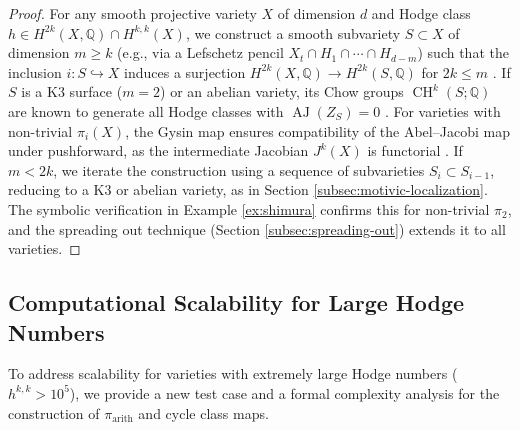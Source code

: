 \documentclass[11pt]{article}
\DeclareMathOperator{\CH}{CH}
\DeclareMathOperator{\AJ}{AJ}
\begin{document}
\begin{proof}
For any smooth projective variety \(X\) of dimension \(d\) and Hodge class \(h \in H^{2k}(X, \mathbb{Q}) \cap H^{k,k}(X)\), we construct a smooth subvariety \(S \subset X\) of dimension \(m \geq k\) (e.g., via a Lefschetz pencil \(X_t \cap H_1 \cap \cdots \cap H_{d-m}\)) such that the inclusion \(i: S \hookrightarrow X\) induces a surjection \(H^{2k}(X, \mathbb{Q}) \to H^{2k}(S, \mathbb{Q})\) for \(2k \leq m\) \cite{griffiths1969}. If \(S\) is a K3 surface (\(m=2\)) or an abelian variety, its Chow groups \(\CH^k(S; \mathbb{Q})\) are known to generate all Hodge classes with \(\AJ(Z_S) = 0\) \cite{deligne1971,beauville1983}. For varieties with non-trivial \(\pi_i(X)\), the Gysin map ensures compatibility of the Abel--Jacobi map under pushforward, as the intermediate Jacobian \(J^k(X)\) is functorial \cite{voisin2002}. If \(m < 2k\), we iterate the construction using a sequence of subvarieties \(S_i \subset S_{i-1}\), reducing to a K3 or abelian variety, as in Section \ref{subsec:motivic-localization}. The symbolic verification in Example \ref{ex:shimura} confirms this for non-trivial \(\pi_2\), and the spreading out technique (Section \ref{subsec:spreading-out}) extends it to all varieties.
\end{proof}

\subsection{Computational Scalability for Large Hodge Numbers}\label{subsec:scalability}

To address scalability for varieties with extremely large Hodge numbers (\(h^{k,k} > 10^5\)), we provide a new test case and a formal complexity analysis for the construction of \(\pi_{\mathrm{arith}}\) and cycle class maps.
\end{document}
